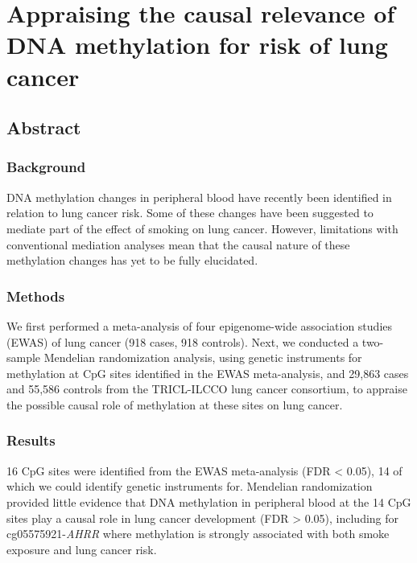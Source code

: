 \documentclass[11pt,oneside]{bristolthesis}
\begin{document}
\hypertarget{dnam-lung-cancer-mr}{%
\chapter{Appraising the causal relevance of DNA methylation for risk of lung cancer}\label{dnam-lung-cancer-mr}}

\hypertarget{abstract-07}{%
\section{Abstract}\label{abstract-07}}

\hypertarget{abstract-background-07}{%
\subsection{Background}\label{abstract-background-07}}

DNA methylation changes in peripheral blood have recently been identified in relation to lung cancer risk. Some of these changes have been suggested to mediate part of the effect of smoking on lung cancer. However, limitations with conventional mediation analyses mean that the causal nature of these methylation changes has yet to be fully elucidated.

\hypertarget{abstract-methods-07}{%
\subsection{Methods}\label{abstract-methods-07}}

We first performed a meta-analysis of four epigenome-wide association studies (EWAS) of lung cancer (918 cases, 918 controls). Next, we conducted a two-sample Mendelian randomization analysis, using genetic instruments for methylation at CpG sites identified in the EWAS meta-analysis, and 29,863 cases and 55,586 controls from the TRICL-ILCCO lung cancer consortium, to appraise the possible causal role of methylation at these sites on lung cancer.

\hypertarget{abstract-results-07}{%
\subsection{Results}\label{abstract-results-07}}

16 CpG sites were identified from the EWAS meta-analysis (FDR \textless{} 0.05), 14 of which we could identify genetic instruments for. Mendelian randomization provided little evidence that DNA methylation in peripheral blood at the 14 CpG sites play a causal role in lung cancer development (FDR \textgreater{} 0.05), including for cg05575921-\emph{AHRR} where methylation is strongly associated with both smoke exposure and lung cancer risk.
\end{document}
